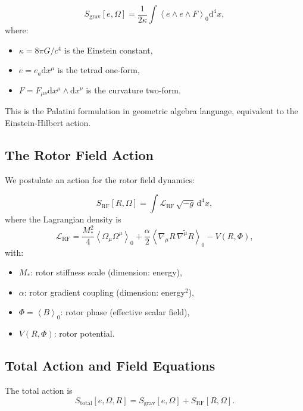 \documentclass[11pt,a4paper]{article}
\numberwithin{equation}{section}
\theoremstyle{plain}
\theoremstyle{definition}
\theoremstyle{remark}
\newcommand{\grade}[2]{\left\langle #1 \right\rangle_{#2}}
\newcommand{\scal}[1]{\grade{#1}{0}}       %
\newcommand{\rev}[1]{\widetilde{#1}}       %
\newcommand{\dd}{\mathrm{d}}
\begin{document}
\begin{equation}
S_{\mathrm{grav}}[e,\Omega] = \frac{1}{2\kappa} \int \scal{e \wedge e \wedge F} \dd^4x,
\label{eq:palatini-action}
\end{equation}
where:
\begin{itemize}
\item $\kappa = 8\pi G/c^4$ is the Einstein constant,
\item $e = e_a \dd x^\mu$ is the tetrad one-form,
\item $F = F_{\mu\nu} \dd x^\mu \wedge \dd x^\nu$ is the curvature two-form.
\end{itemize}

This is the Palatini formulation in geometric algebra language, equivalent to the Einstein-Hilbert action.

\subsection{The Rotor Field Action}

We postulate an action for the rotor field dynamics:

\begin{equation}
S_{\mathrm{RF}}[R,\Omega] = \int \mathcal{L}_{\mathrm{RF}}\, \sqrt{-g}\, \dd^4x,
\label{eq:rotor-action}
\end{equation}
where the Lagrangian density is
\begin{equation}
\mathcal{L}_{\mathrm{RF}} = \frac{M_*^2}{4}\scal{\Omega_\mu \Omega^\mu} + \frac{\alpha}{2}\scal{\nabla_\mu R \, \rev{\nabla^\mu R}} - V(R,\Phi),
\label{eq:rotor-lagrangian}
\end{equation}
with:
\begin{itemize}
\item $M_*$: rotor stiffness scale (dimension: energy),
\item $\alpha$: rotor gradient coupling (dimension: energy$^2$),
\item $\Phi = \scal{B}$: rotor phase (effective scalar field),
\item $V(R,\Phi)$: rotor potential.
\end{itemize}

\subsection{Total Action and Field Equations}

The total action is
\begin{equation}
S_{\mathrm{total}}[e,\Omega,R] = S_{\mathrm{grav}}[e,\Omega] + S_{\mathrm{RF}}[R,\Omega].
\label{eq:total-action}
\end{equation}
\end{document}
